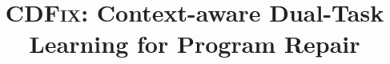 \documentclass[10pt,conference]{IEEEtran}
\newcommand{\tool}{\textsc{CDFix}\xspace}
\begin{document}
\title{{\tool}: Context-aware Dual-Task Learning for Program Repair}


\maketitle
\end{document}
